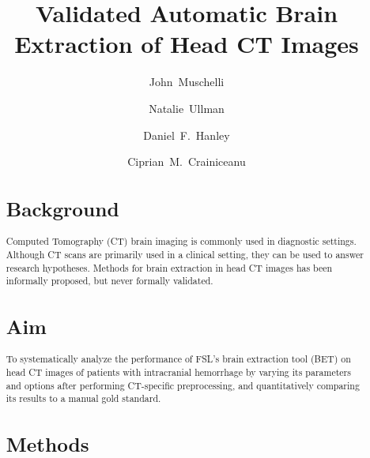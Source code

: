 \documentclass{elsarticle}\usepackage[]{graphicx}\usepackage[]{color}
\begin{document}
\renewcommand{\thesubfigure}{\Alph{subfigure}}

\begin{frontmatter}

\date{}

\title{Validated Automatic Brain Extraction of Head CT Images}

\author[jhsph]{John~Muschelli}

\author[jhmi]{Natalie~Ullman}

\author[jhmi]{Daniel~F.~Hanley}

\author[jhsph]{Ciprian~M.~Crainiceanu}

\address[jhsph]{Department of Biostatistics, Bloomberg School of Public Health, Johns Hopkins University, Baltimore, MD, USA}
\address[jhmi]{Department of Neurology, Division of Brain Injury Outcomes,  Johns Hopkins Medical Institutions, Baltimore, MD, USA}

\begin{abstract}
\section{Background}
Computed Tomography (CT) brain imaging is commonly used in diagnostic settings.  Although CT scans are primarily used in a clinical setting, they can be used to answer research hypotheses.  Methods for brain extraction in head CT images has been informally proposed, but never formally validated.


\section{Aim}

To systematically analyze the performance of FSL's brain extraction tool (BET) on head CT images of patients with intracranial hemorrhage by varying its parameters and options after performing CT-specific preprocessing, and quantitatively comparing its results to a manual gold standard.

\section{Methods}


\end{abstract}
\end{frontmatter}
\end{document}
